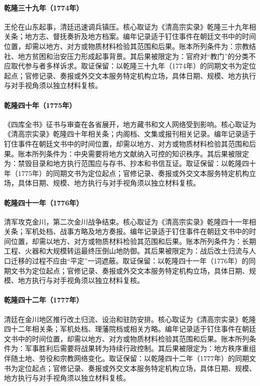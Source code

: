 \hypertarget{ledger:EQ-1774-WANG-LUN-UPRISING}{}\paragraph{乾隆三十九年（1774年）}王伦在山东起事，清廷迅速调兵镇压。核心取证为《清高宗实录》乾隆三十九年相关条；地方志、督抚奏折及地方档案。编年记录适于钉住事件在朝廷文书中的时间位置，却需以地方、对方或物质材料检验其范围和后果。账本所列条件为：宗教结社、地方贫困和治安压力形成起事背景。其后果被限定为：官府对“教门”的分类不应取代参与者多样诉求。取证保留：以乾隆三十九年（1774年）的同期文书为定位起点；官修记录、奏报或外交文本服务特定机构立场，具体日期、规模、地方执行与对手视角须以独立材料复核。
\hypertarget{ledger:EQ-1775-SIKU-COLLECTION}{}\paragraph{乾隆四十年（1775年）}《四库全书》征书与审查在各省展开，地方藏书和文人网络受到影响。核心取证为《清高宗实录》乾隆四十年相关条；内阁档、文集或报刊相关记录。编年记录适于钉住事件在朝廷文书中的时间位置，却需以地方、对方或物质材料检验其范围和后果。账本所列条件为：中央需要将地方文献纳入可控的知识秩序。其后果被限定为：禁毁目录和地方执行范围应与存书、抄本和书信互证。取证保留：以乾隆四十年（1775年）的同期文书为定位起点；官修记录、奏报或外交文本服务特定机构立场，具体日期、规模、地方执行与对手视角须以独立材料复核。
\hypertarget{ledger:EQ-1776-JINCHUAN-CONQUEST}{}\paragraph{乾隆四十一年（1776年）}清军攻克金川，第二次金川战争结束。核心取证为《清高宗实录》乾隆四十一年相关条；军机处档、战事方略及地方奏报。编年记录适于钉住事件在朝廷文书中的时间位置，却需以地方、对方或物质材料检验其范围和后果。账本所列条件为：长期工程、火器和大规模转运最终压倒山地防御。其后果被限定为：战后改土归流与人口迁移的过程不应由“平定”一词遮蔽。取证保留：以乾隆四十一年（1776年）的同期文书为定位起点；官修记录、奏报或外交文本服务特定机构立场，具体日期、规模、地方执行与对手视角须以独立材料复核。
\hypertarget{ledger:EQ-1777-JINCHUAN-ADMINISTRATIVE-RESET}{}\paragraph{乾隆四十二年（1777年）}清廷在金川地区推行改土归流、设治和驻防安排。核心取证为《清高宗实录》乾隆四十二年相关条；军机处档、理藩院档或相关方略。编年记录适于钉住事件在朝廷文书中的时间位置，却需以地方、对方或物质材料检验其范围和后果。账本所列条件为：军事胜利后需要将战果转为持续行政控制。其后果被限定为：地方秩序重组伴随土地、劳役和宗教网络变化。取证保留：以乾隆四十二年（1777年）的同期文书为定位起点；官修记录、奏报或外交文本服务特定机构立场，具体日期、规模、地方执行与对手视角须以独立材料复核。
